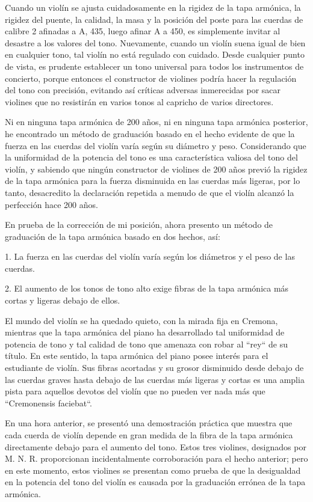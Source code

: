 \documentclass[12pt]{book}
\begin{document}
Cuando un violín se ajusta cuidadosamente en la rigidez de la tapa armónica, la rigidez del puente, la calidad, la masa y la posición del poste para las cuerdas de calibre 2 afinadas a A, 435, luego afinar A a 450, es simplemente invitar al desastre a los valores del tono. Nuevamente, cuando un violín suena igual de bien en cualquier tono, tal violín no está regulado con cuidado. Desde cualquier punto de vista, es prudente establecer un tono universal para todos los instrumentos de concierto, porque entonces el constructor de violines podría hacer la regulación del tono con precisión, evitando así críticas adversas inmerecidas por sacar violines que no resistirán en varios tonos al capricho de varios directores.

Ni en ninguna tapa armónica de 200 años, ni en ninguna tapa armónica posterior, he encontrado un método de graduación basado en el hecho evidente de que la fuerza en las cuerdas del violín varía según su diámetro y peso. Considerando que la uniformidad de la potencia del tono es una característica valiosa del tono del violín, y sabiendo que ningún constructor de violines de 200 años previó la rigidez de la tapa armónica para la fuerza disminuida en las cuerdas más ligeras, por lo tanto, desacredito la declaración repetida a menudo de que el violín alcanzó la perfección hace 200 años.

En prueba de la corrección de mi posición, ahora presento un método de graduación de la tapa armónica basado en dos hechos, así:

1. La fuerza en las cuerdas del violín varía según los diámetros y el peso de las cuerdas.

2. El aumento de los tonos de tono alto exige fibras de la tapa armónica más cortas y ligeras debajo de ellos.

El mundo del violín se ha quedado quieto, con la mirada fija en Cremona, mientras que la tapa armónica del piano ha desarrollado tal uniformidad de potencia de tono y tal calidad de tono que amenaza con robar al ``rey`` de su título. En este sentido, la tapa armónica del piano posee interés para el estudiante de violín. Sus fibras acortadas y su grosor disminuido desde debajo de las cuerdas graves hasta debajo de las cuerdas más ligeras y cortas es una amplia pista para aquellos devotos del violín que no pueden ver nada más que ``Cremonensis faciebat``.

En una hora anterior, se presentó una demostración práctica que muestra que cada cuerda de violín depende en gran medida de la fibra de la tapa armónica directamente debajo para el aumento del tono. Estos tres violines, designados por M. N. R. proporcionan incidentalmente corroboración para el hecho anterior; pero en este momento, estos violines se presentan como prueba de que la desigualdad en la potencia del tono del violín es causada por la graduación errónea de la tapa armónica.
\end{document}
